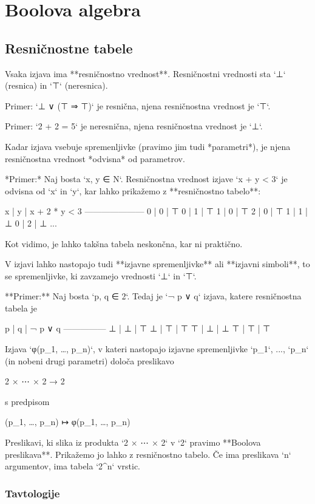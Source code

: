 \chapter{Boolova algebra}

\section{Resničnostne tabele}

Vsaka izjava ima **resničnostno vrednost**. Resničnostni vrednosti sta `⊥`
(resnica) in `⊤` (neresnica).

Primer: `⊥ ∨ (⊤ ⇒ ⊤)` je resnična, njena resničnostna vrednost je `⊤`.

Primer: `2 + 2 = 5` je neresnična, njena resničnostna vrednost je `⊥`.

Kadar izjava vsebuje spremenljivke (pravimo jim tudi *parametri*), je njena
resničnostna vrednost *odvisna* od parametrov.

*Primer:* Naj bosta `x, y ∈ N`. Resničnostna vrednost izjave `x + y < 3` je odvisna
od `x` in `y`, kar lahko prikažemo z **resničnostno tabelo**:

    x | y | x + 2 * y < 3
    ---------------------
    0 | 0 |    ⊤
    0 | 1 |    ⊤
    1 | 0 |    ⊤
    2 | 0 |    ⊤
    1 | 1 |    ⊥
    0 | 2 |    ⊥
    ...

Kot vidimo, je lahko takšna tabela neskončna, kar ni praktično.

V izjavi lahko nastopajo tudi **izjavne spremenljivke** ali **izjavni simboli**,
to se spremenljivke, ki zavzamejo vrednosti `⊥` in `⊤`.

**Primer:** Naj bosta `p, q ∈ 2`. Tedaj je `¬ p ∨ q` izjava, katere resničnostna tabela je

    p | q | ¬ p ∨ q
    ---------------
    ⊥ | ⊥ |    ⊤
    ⊥ | ⊤ |    ⊤
    ⊤ | ⊥ |    ⊥
    ⊤ | ⊤ |    ⊤

Izjava `φ(p_1, …, p_n)`, v kateri nastopajo izjavne spremenljivke `p_1`, ...,
`p_n` (in nobeni drugi parametri) določa preslikavo

    2 × ⋯ × 2 → 2

s predpisom

    (p_1, …, p_n) ↦ φ(p_1, …, p_n)

Preslikavi, ki slika iz produkta `2 × ⋯ × 2` v `2` pravimo **Boolova
preslikava**. Prikažemo jo lahko z resničnostno tabelo. Če ima preslikava `n`
argumentov, ima tabela `2^n` vrstic.

\subsection{Tavtologije}

